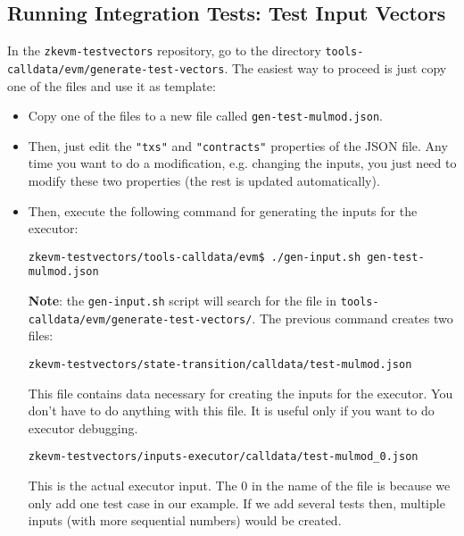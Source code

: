 \subsection{Running Integration Tests: Test Input Vectors}

In the \texttt{zkevm-testvectors} repository, go to the directory \texttt{tools-calldata/evm/generate-test-vectors}. The easiest way to proceed is just copy one of the files and use it as template:


\begin{itemize}

\item Copy one of the files to a new file called \texttt{gen-test-mulmod.json}.

\item  Then, just edit the \texttt{"txs"} and \texttt{"contracts"} properties of the JSON file. Any time you want to do a modification, e.g. changing the inputs, you just need to modify these two properties (the rest is updated automatically).

\begin{json}
    [
    { "contracts": [{"contractName": "OpMuldMod", "paramsDeploy": {} }]},
    "txs": [{
        "from": "0x4d5Cf5032B2a844602278b01199ED191A86c93ff",
        "to": "contract",
        "nonce": "0",
        "value": "0",
        "contractName": "OpMuldMod",
        "function": "MulMod",
        "params": [ 256, 100000, 256 ],
        "gasLimit": 100000,
        "gasPrice": "1000000000",
        "chainId": 1000
    }],
}
]
\end{json}

\item Then, execute the following command for generating the inputs for the executor:
\begin{lstlisting}[style=termt]
    zkevm-testvectors/tools-calldata/evm$ ./gen-input.sh gen-test-mulmod.json
\end{lstlisting}
\textbf{Note}: the \texttt{gen-input.sh} script will search for the file in \texttt{tools-calldata/evm/generate-test-vectors/}.
\normalsize
The previous command creates two files:

\texttt{zkevm-testvectors/state-transition/calldata/test-mulmod.json}

This file contains data necessary for creating the inputs for the executor. You don't have to do anything with this file. It is useful only if you want to do executor debugging.

\texttt{zkevm-testvectors/inputs-executor/calldata/test-mulmod\_0.json}

This is the actual executor input. The 0 in the name of the file is because we only add one test case in our example. If we add several tests then, multiple inputs (with more sequential numbers) would be created.

\end{itemize} 
  

















